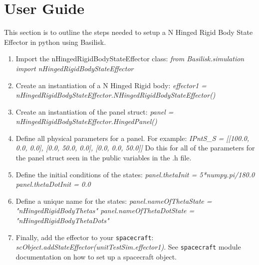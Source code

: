 \section{User Guide}

This section is to outline the steps needed to setup a N Hinged Rigid Body State Effector in python using Basilisk.

\begin{enumerate}
	\item Import the nHingedRigidBodyStateEffector class: \newline \textit{from Basilisk.simulation import nHingedRigidBodyStateEffector}
	\item Create an instantiation of a N Hinged Rigid body: \newline \textit{effector1 = nHingedRigidBodyStateEffector.NHingedRigidBodyStateEffector()}
	\item Create an instantiation of the panel struct: \newline \textit{panel = nHingedRigidBodyStateEffector.HingedPanel()}
	\item Define all physical parameters for a panel. For example: \newline
	\textit{IPntS\_S = [[100.0, 0.0, 0.0], [0.0, 50.0, 0.0], [0.0, 0.0, 50.0]]}
	Do this for all of the parameters for the panel struct seen in the public variables in the .h file.
	\item Define the initial conditions of the states:\newline
	\textit{panel.thetaInit = 5*numpy.pi/180.0 \quad panel.thetaDotInit = 0.0}
	\item Define a unique name for the states:\newline
	\textit{panel.nameOfThetaState = "nHingedRigidBodyThetas" \quad panel.nameOfThetaDotState = "nHingedRigidBodyThetaDots"}
	\item Finally, add the effector to your {\tt spacecraft}:\newline
	\textit{scObject.addStateEffector(unitTestSim.effector1)}. See {\tt spacecraft} module documentation on how to set up a spacecraft object.
\end{enumerate}
